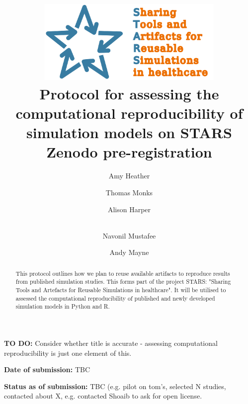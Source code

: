 \title{
    \includegraphics[width=9cm]{images/stars_pointy_v2_text2.png}\\[1cm]
    \textbf{Protocol for assessing the computational reproducibility of simulation models on STARS} \\
    \large Zenodo pre-registration
}

\author[1]{ Amy Heather}
\author[1]{ Thomas Monks}
\author[2]{ Alison Harper}
\author[2]{\\  Navonil Mustafee}
\author[3]{ Andy Mayne}


\date{}

\maketitle

\textbf{TO DO:} Consider whether title is accurate - assessing computational reproducibility is just one element of this.

\begin{shaded}
    \begin{abstract}
        This protocol outlines how we plan to reuse available artifacts to reproduce results from published simulation studies. This forms part of the project STARS: "Sharing Tools and Artefacts for Reusable Simulations in healthcare". It will be utilised to assessed the computational reproducibility of published and newly developed simulation models in Python and R.
    \end{abstract}
\end{shaded}

\vspace{0.5cm}

\textbf{Date of submission:} TBC

\textbf{Status as of submission:} TBC (e.g. pilot on tom's, selected N studies, contacted about X, e.g. contacted Shoaib to ask for open license.

\newpage
\tableofcontents
